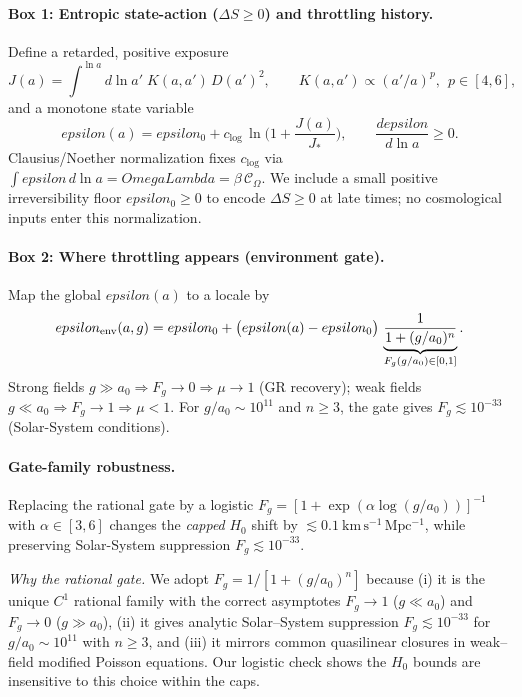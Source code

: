 \documentclass[aps,prd,onecolumn,superscriptaddress,nofootinbib]{revtex4-2}
\def\OmL{OmegaLambda}%
\def\eps{epsilon}%
\newcommand{\OmL}{\Omega_\Lambda}
\newcommand{\eps}{\varepsilon}
\begin{document}
\paragraph*{Box 1: Entropic state-action ($\Delta S\ge 0$) and throttling history.}
Define a retarded, positive exposure
\begin{equation}
J(a)=\int^{\ln a}\!d\ln a'\;K(a,a')\,D(a')^2,\qquad K(a,a')\propto (a'/a)^p,\ \ p\in[4,6],
\end{equation}
and a monotone state variable
\begin{equation}
\eps(a)=\eps_0+c_{\log}\,\ln\!\Big(1+\frac{J(a)}{J_*}\Big),\qquad \frac{d\eps}{d\ln a}\ge 0.
\end{equation}
Clausius/Noether normalization fixes $c_{\log}$ via $\int \eps\,d\ln a=\OmL=\beta\,\mathcal C_\Omega$. We include a small positive irreversibility floor $\eps_0\ge 0$ to encode $\Delta S\ge 0$ at late times; no cosmological inputs enter this normalization.

\paragraph*{Box 2: Where throttling appears (environment gate).}
Map the global $\eps(a)$ to a locale by
\begin{equation}
\eps_{\rm env}(a,g)=\eps_0+\big(\eps(a)-\eps_0\big)\,\underbrace{\frac{1}{1+(g/a_0)^n}}_{F_g(g/a_0)\in[0,1]} .
\end{equation}
Strong fields $g\gg a_0\Rightarrow F_g\to 0\Rightarrow \mu\to 1$ (GR recovery); weak fields $g\ll a_0\Rightarrow F_g\to 1\Rightarrow \mu<1$. For $g/a_0\sim 10^{11}$ and $n\ge 3$, the gate gives $F_g\lesssim 10^{-33}$ (Solar-System conditions).

\paragraph*{Gate-family robustness.}
Replacing the rational gate by a logistic \(F_g=[1+\exp(\alpha\log(g/a_0))]^{-1}\) with \(\alpha\in[3,6]\) changes the \emph{capped} $H_0$ shift by $\lesssim 0.1\ \mathrm{km\,s^{-1}\,Mpc^{-1}}$, while preserving Solar-System suppression \(F_g\lesssim 10^{-33}\).

\noindent\emph{Why the rational gate.}
We adopt $F_g=1/[1+(g/a_0)^n]$ because (i) it is the unique $C^1$ rational family with the correct asymptotes $F_g\!\to\!1$ ($g\!\ll\!a_0$) and $F_g\!\to\!0$ ($g\!\gg\!a_0$), (ii) it gives analytic Solar–System suppression $F_g\!\lesssim\!10^{-33}$ for $g/a_0\!\sim\!10^{11}$ with $n\!\ge\!3$, and (iii) it mirrors common quasilinear closures in weak–field modified Poisson equations. Our logistic check shows the $H_0$ bounds are insensitive to this choice within the caps.
\end{document}
